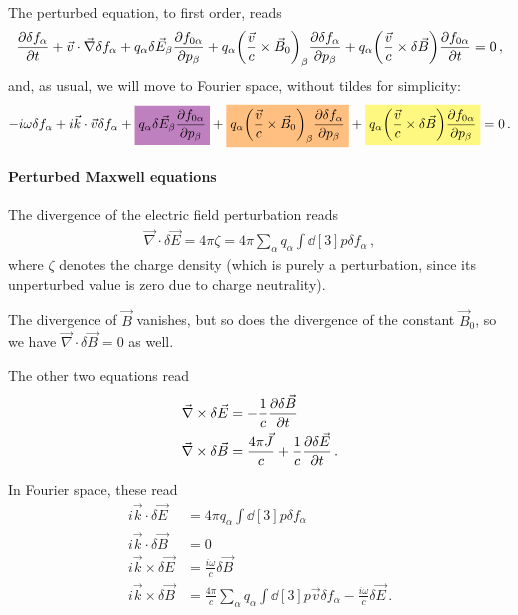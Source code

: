 \documentclass[main.tex]{subfiles}
\begin{document}
The perturbed equation, to first order, reads 
%
\begin{align}
\pdv{ \delta f_\alpha }{t} + \vec{v} \cdot \vec{\nabla} \delta f_\alpha + q_\alpha \delta \vec{E}_\beta \pdv{f_{0 \alpha }}{p_\beta } + q_\alpha \qty( \frac{\vec{v}}{c} \times \vec{B}_0)_\beta \pdv{ \delta f_\alpha }{p_\beta } 
+ q_\alpha \qty( \frac{\vec{v}}{c} \times \delta \vec{B}) \pdv{f_{0 \alpha }}{t} = 0
\,,
\end{align}
%
and, as usual, we will move to Fourier space, without tildes for simplicity: 
%
\begin{align} \label{eq:perturbed-fourier-space-vlasov}
- i \omega \delta f_\alpha 
+ i \vec{k} \cdot \vec{v} \delta f_\alpha 
+ \hlc{violet}{q_\alpha \delta \vec{E}_\beta \pdv{f_{0 \alpha }}{p_\beta }} 
+ \hlc{orange}{q_\alpha \qty( \frac{\vec{v}}{c} \times \vec{B}_0)_\beta \pdv{ \delta f_\alpha }{p_\beta }}
+ \hlc{yellow}{q_\alpha \qty( \frac{\vec{v}}{c} \times \delta \vec{B}) 
\pdv{f_{0 \alpha }}{p_\beta }} = 0
\,.
\end{align}

\paragraph{Perturbed Maxwell equations}

The divergence of the electric field perturbation reads 
%
\begin{align}
\vec{\nabla} \cdot \delta \vec{E} = 4 \pi \zeta = 4 \pi \sum _{\alpha } q_\alpha \int \dd[3]{p} \delta f_\alpha 
\,,
\end{align}
%
where \(\zeta \) denotes the charge density (which is purely a perturbation, since its unperturbed value is zero due to charge neutrality).

The divergence of \(\vec{B}\) vanishes, but so does the divergence of the constant \(\vec{B}_0\), so we have \(\vec{\nabla} \cdot \delta \vec{B} = 0\) as well. 

The other two equations read 
%
\begin{align}
\vec{\nabla} \times \delta \vec{E} &= - \frac{1}{c} \pdv{ \delta \vec{B} }{t}  \\
\vec{\nabla} \times \delta \vec{B} &= \frac{4 \pi \vec{J}}{c} + \frac{1}{c} \pdv{ \delta \vec{E}}{t}
\,.
\end{align}

In Fourier space, these read 
%
\begin{align}
i \vec{k} \cdot \delta \vec{E} &= 4 \pi q_\alpha \int \dd[3]{p} \delta f_\alpha  \\
i \vec{k} \cdot \delta \vec{B} &= 0  \\
i \vec{k} \times \delta \vec{E} &= \frac{i \omega }{c} \delta \vec{B}  \\
i \vec{k} \times \delta \vec{B} &= \frac{4 \pi }{c} \sum _{\alpha } q_\alpha \int \dd[3]{p} \vec{v} \delta f_\alpha - \frac{i \omega }{c} \delta \vec{E}
\,.
\end{align}
\end{document}
